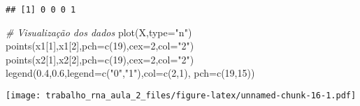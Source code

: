 \documentclass[
]{article}
\newenvironment{Shaded}{\begin{snugshade}}{\end{snugshade}}
\newcommand{\AttributeTok}[1]{\textcolor[rgb]{0.77,0.63,0.00}{#1}}
\newcommand{\CommentTok}[1]{\textcolor[rgb]{0.56,0.35,0.01}{\textit{#1}}}
\newcommand{\DecValTok}[1]{\textcolor[rgb]{0.00,0.00,0.81}{#1}}
\newcommand{\FloatTok}[1]{\textcolor[rgb]{0.00,0.00,0.81}{#1}}
\newcommand{\FunctionTok}[1]{\textcolor[rgb]{0.00,0.00,0.00}{#1}}
\newcommand{\NormalTok}[1]{#1}
\newcommand{\StringTok}[1]{\textcolor[rgb]{0.31,0.60,0.02}{#1}}
\begin{document}
\begin{verbatim}
## [1] 0 0 0 1
\end{verbatim}

\begin{Shaded}
\begin{Highlighting}[]
\CommentTok{\# Visualização dos dados}
\FunctionTok{plot}\NormalTok{(X,}\AttributeTok{type=}\StringTok{"n"}\NormalTok{)}
\FunctionTok{points}\NormalTok{(x1[}\DecValTok{1}\NormalTok{],x1[}\DecValTok{2}\NormalTok{],}\AttributeTok{pch=}\FunctionTok{c}\NormalTok{(}\DecValTok{19}\NormalTok{),}\AttributeTok{cex=}\DecValTok{2}\NormalTok{,}\AttributeTok{col=}\StringTok{"2"}\NormalTok{)}
\FunctionTok{points}\NormalTok{(x2[}\DecValTok{1}\NormalTok{],x2[}\DecValTok{2}\NormalTok{],}\AttributeTok{pch=}\FunctionTok{c}\NormalTok{(}\DecValTok{19}\NormalTok{),}\AttributeTok{cex=}\DecValTok{2}\NormalTok{,}\AttributeTok{col=}\StringTok{"2"}\NormalTok{)}
\FunctionTok{legend}\NormalTok{(}\FloatTok{0.4}\NormalTok{,}\FloatTok{0.6}\NormalTok{,}\AttributeTok{legend=}\FunctionTok{c}\NormalTok{(}\StringTok{"0"}\NormalTok{,}\StringTok{"1"}\NormalTok{),}\AttributeTok{col=}\FunctionTok{c}\NormalTok{(}\DecValTok{2}\NormalTok{,}\DecValTok{1}\NormalTok{), }\AttributeTok{pch=}\FunctionTok{c}\NormalTok{(}\DecValTok{19}\NormalTok{,}\DecValTok{15}\NormalTok{))}
\end{Highlighting}
\end{Shaded}

\texttt{[image: trabalho\_rna\_aula\_2\_files/figure-latex/unnamed-chunk-16-1.pdf]}
\end{document}
